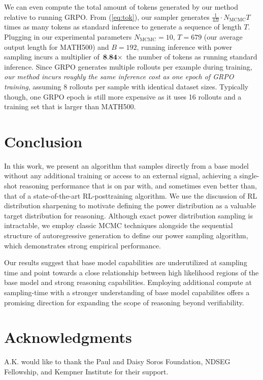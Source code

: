 \documentclass{article}
\begin{document}
We can even compute the total amount of tokens generated by our method relative to running GRPO. From (\ref{eq:tok}), our sampler generates $\frac{1}{4B} \cdot {N_{\text{MCMC}}T}$ times as many tokens as standard inference to generate a sequence of length $T$. Plugging in our experimental parameters $N_{\text{MCMC}} = 10$, $T = 679$ (our average output length for MATH500) and $B = 192$, running inference with power sampling incurs a multiplier of $\textbf{8.84} \times$ the number of tokens as running standard inference. Since GRPO generates multiple rollouts per example during training, \textit{our method incurs roughly the same inference cost as one epoch of GRPO training}, assuming 8 rollouts per sample with identical dataset sizes. Typically though, one GRPO epoch is still more expensive as it uses 16 rollouts and a training set that is larger than MATH500. 


\section{Conclusion}

In this work, we present an algorithm that samples directly from a base model without any additional training or access to an external signal, achieving a single-shot reasoning performance that is on par with, and sometimes even better than, that of a state-of-the-art RL-posttraining algorithm. We use the discussion of RL distribution sharpening to motivate defining the power distribution as a valuable target distribution for reasoning. Although exact power distribution sampling is intractable, we employ classic MCMC techniques alongside the sequential structure of autoregressive generation to define our power sampling algorithm, which demonstrates strong empirical performance.

Our results suggest that base model capabilities are underutilized at sampling time and point towards a close relationship between high likelihood regions of the base model and strong reasoning capabilities. Employing additional compute at sampling-time with a stronger understanding of base model capabilites offers a promising direction for expanding the scope of reasoning beyond verifiability.


\section{Acknowledgments}
A.K. would like to thank  the Paul and Daisy Soros Foundation, NDSEG Fellowship, and Kempner Institute for their support.
\end{document}
